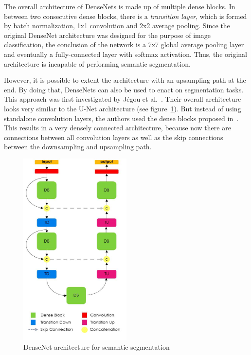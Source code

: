 The overall architecture of DenseNets is made up of multiple dense blocks. In between two consecutive dense blocks, there is a \emph{transition layer}, which is formed by batch normalization, 1x1 convolution and 2x2 average pooling. Since the original DenseNet architecture was designed for the purpose of image classification, the conclusion of the network is a 7x7 global average pooling layer and eventually a fully-connected layer with softmax activation. Thus, the original architecture is incapable of performing semantic segmentation.

However, it is possible to extent the architecture with an upsampling path at the end. By doing that, DenseNets can also be used to enact on segmentation tasks. This approach was first investigated by Jégou et al.~\cite{denseseg17}. Their overall architecture looks very similar to the U-Net architecture (see figure~\ref{fig:densenet_segmentation}). But instead of using standalone convolution layers, the authors used the dense blocks proposed in~\cite{densenet18}. This results in a very densely connected architecture, because now there are connections between all convolution layers as well as the skip connections between the downsampling and upsampling path.

\begin{figure}[h]
    \centering
    \includegraphics[width=0.5\textwidth]{images/dense_segmentation_architecture}
    \caption{DenseNet architecture for semantic segmentation~\cite{denseseg17}}
    \label{fig:densenet_segmentation}
\end{figure}

